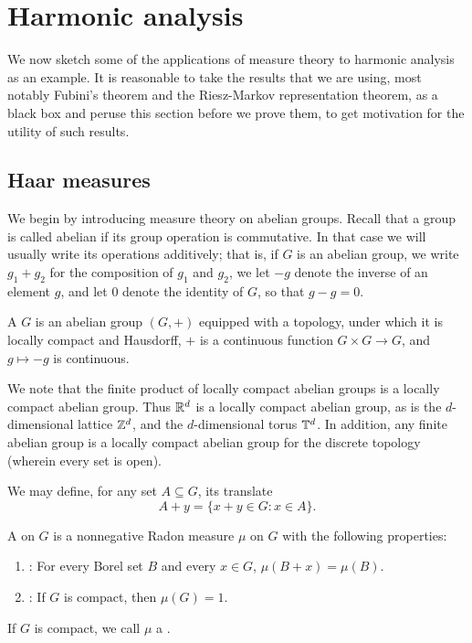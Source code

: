 \chapter{Harmonic analysis}

We now sketch some of the applications of measure theory to harmonic analysis as an example.
It is reasonable to take the results that we are using, most notably Fubini's theorem and the Riesz-Markov representation theorem, as a black box and peruse this section before we prove them, to get motivation for the utility of such results.

\section{Haar measures}
We begin by introducing measure theory on abelian groups. Recall that a group is called abelian if its group operation is commutative.
In that case we will usually write its operations additively; that is, if $G$ is an abelian group, we write $g_1 + g_2$ for the composition of $g_1$ and $g_2$, we let $-g$ denote the inverse of an element $g$, and let $0$ denote the identity of $G$, so that $g - g = 0$.

\begin{definition}
A  $G$ is an abelian group $(G, +)$ equipped with a topology, under which it is locally compact and Hausdorff, $+$ is a continuous function $G \times G \to G$, and $g \mapsto -g$ is continuous.
\end{definition}

We note that the finite product of locally compact abelian groups is a locally compact abelian group.
Thus $\mathbb{R}^d$ is a locally compact abelian group, as is the $d$-dimensional lattice $\mathbb{Z}^d$, and the $d$-dimensional torus $\mathbb{T}^d$.
In addition, any finite abelian group is a locally compact abelian group for the discrete topology (wherein every set is open).

We may define, for any set $A \subseteq G$, its translate
$$A + y = \{x + y \in G: x \in A\}.$$

\begin{definition}
A  on $G$ is a nonnegative Radon measure $\mu$ on $G$ with the following properties:
\begin{enumerate}
\item {}: For every Borel set $B$ and every $x \in G$, $\mu(B+x) = \mu(B)$.
\item {}: If $G$ is compact, then $\mu(G) = 1$.
\end{enumerate}
If $G$ is compact, we call $\mu$ a .
\end{definition}

